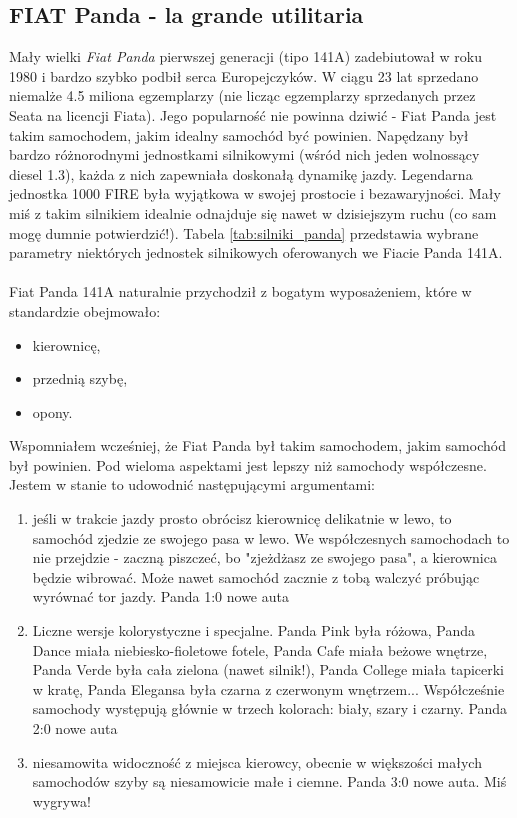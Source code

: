\subsection{FIAT Panda - la grande utilitaria}
Mały wielki \textit{Fiat Panda} pierwszej generacji (tipo 141A) zadebiutował w roku 1980 i bardzo szybko podbił serca Europejczyków. W ciągu 23 lat sprzedano niemalże 4.5 miliona egzemplarzy (nie licząc egzemplarzy sprzedanych przez Seata na licencji Fiata). Jego popularność nie powinna dziwić - Fiat Panda jest takim samochodem, jakim idealny samochód być powinien. Napędzany był bardzo różnorodnymi jednostkami silnikowymi (wśród nich jeden wolnossący diesel 1.3), każda z nich zapewniała doskonałą dynamikę jazdy. Legendarna jednostka 1000 FIRE była wyjątkowa w swojej prostocie i bezawaryjności. Mały miś z takim silnikiem idealnie odnajduje się nawet w dzisiejszym ruchu (co sam mogę dumnie potwierdzić!). Tabela \ref{tab:silniki_panda} przedstawia wybrane parametry niektórych jednostek silnikowych oferowanych we Fiacie Panda 141A.\\
\\

Fiat Panda 141A naturalnie przychodził z bogatym wyposażeniem, które w standardzie obejmowało:
\begin{itemize}
    \item kierownicę,
    \item przednią szybę,
    \item opony.
\end{itemize}

Wspomniałem wcześniej, że Fiat Panda był takim samochodem, jakim samochód był powinien. Pod wieloma aspektami jest lepszy niż samochody współczesne. Jestem w stanie to udowodnić następującymi argumentami:
\begin{enumerate}
    \item jeśli w trakcie jazdy prosto obrócisz kierownicę delikatnie w lewo, to samochód zjedzie ze swojego pasa w lewo. We współczesnych samochodach to nie przejdzie - zaczną piszczeć, bo "zjeżdżasz ze swojego pasa", a kierownica będzie wibrować. Może nawet samochód zacznie z tobą walczyć próbując wyrównać tor jazdy. Panda 1:0 nowe auta
    \item Liczne wersje kolorystyczne i specjalne. Panda Pink była różowa, Panda Dance miała niebiesko-fioletowe fotele, Panda Cafe miała beżowe wnętrze, Panda Verde była cała zielona (nawet silnik!), Panda College miała tapicerki w kratę, Panda Elegansa była czarna z czerwonym wnętrzem... Współcześnie samochody występują głównie w trzech kolorach: biały, szary i czarny. Panda 2:0 nowe auta
    \item niesamowita widoczność z miejsca kierowcy, obecnie w większości małych samochodów szyby są niesamowicie małe i ciemne. Panda 3:0 nowe auta. Miś wygrywa!
\end{enumerate}

